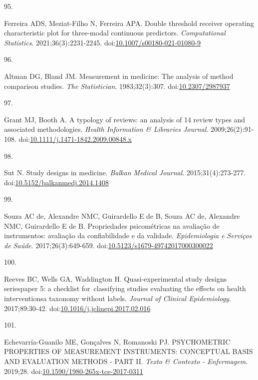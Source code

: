 \documentclass[
]{book}
\newlength{\cslhangindent}
\newlength{\csllabelwidth}
\newlength{\cslentryspacingunit} %
\newenvironment{CSLReferences}[2] %
 {%
  \setlength{\parindent}{0pt}
  \ifodd #1
  \let\oldpar\par
  \def\par{\hangindent=\cslhangindent\oldpar}
  \fi
  \setlength{\parskip}{#2\cslentryspacingunit}
 }%
 {}
\newcommand{\CSLLeftMargin}[1]{\parbox[t]{\csllabelwidth}{#1}}
\newcommand{\CSLRightInline}[1]{\parbox[t]{\linewidth - \csllabelwidth}{#1}\break}
\begin{document}
\begin{CSLReferences}{0}{0}
\leavevmode{}%
\CSLLeftMargin{95. }%
\CSLRightInline{Ferreira ADS, Meziat-Filho N, Ferreira APA. Double threshold receiver operating characteristic plot for three-modal continuous predictors. \emph{Computational Statistics}. 2021;36(3):2231-2245. doi:\href{https://doi.org/10.1007/s00180-021-01080-9}{10.1007/s00180-021-01080-9}}

\leavevmode{}%
\CSLLeftMargin{96. }%
\CSLRightInline{Altman DG, Bland JM. Measurement in medicine: The analysis of method comparison studies. \emph{The Statistician}. 1983;32(3):307. doi:\href{https://doi.org/10.2307/2987937}{10.2307/2987937}}

\leavevmode{}%
\CSLLeftMargin{97. }%
\CSLRightInline{Grant MJ, Booth A. A typology of reviews: an analysis of 14 review types and associated methodologies. \emph{Health Information \& Libraries Journal}. 2009;26(2):91-108. doi:\href{https://doi.org/10.1111/j.1471-1842.2009.00848.x}{10.1111/j.1471-1842.2009.00848.x}}

\leavevmode{}%
\CSLLeftMargin{98. }%
\CSLRightInline{Sut N. Study designs in medicine. \emph{Balkan Medical Journal}. 2015;31(4):273-277. doi:\href{https://doi.org/10.5152/balkanmedj.2014.1408}{10.5152/balkanmedj.2014.1408}}

\leavevmode{}%
\CSLLeftMargin{99. }%
\CSLRightInline{Souza AC de, Alexandre NMC, Guirardello E de B, Souza AC de, Alexandre NMC, Guirardello E de B. Propriedades psicométricas na avaliação de instrumentos: avaliação da confiabilidade e da validade. \emph{Epidemiologia e Serviços de Saúde}. 2017;26(3):649-659. doi:\href{https://doi.org/10.5123/s1679-49742017000300022}{10.5123/s1679-49742017000300022}}

\leavevmode{}%
\CSLLeftMargin{100. }%
\CSLRightInline{Reeves BC, Wells GA, Waddington H. Quasi-experimental study designs series{\textemdash}paper 5: a checklist for~classifying studies evaluating the effects on health interventions{\textemdash}a taxonomy without labels. \emph{Journal of Clinical Epidemiology}. 2017;89:30-42. doi:\href{https://doi.org/10.1016/j.jclinepi.2017.02.016}{10.1016/j.jclinepi.2017.02.016}}

\leavevmode{}%
\CSLLeftMargin{101. }%
\CSLRightInline{Echevarría-Guanilo ME, Gonçalves N, Romanoski PJ. PSYCHOMETRIC PROPERTIES OF MEASUREMENT INSTRUMENTS: CONCEPTUAL BASIS AND EVALUATION METHODS - PART II. \emph{Texto \& Contexto - Enfermagem}. 2019;28. doi:\href{https://doi.org/10.1590/1980-265x-tce-2017-0311}{10.1590/1980-265x-tce-2017-0311}}


\end{CSLReferences}
\end{document}
